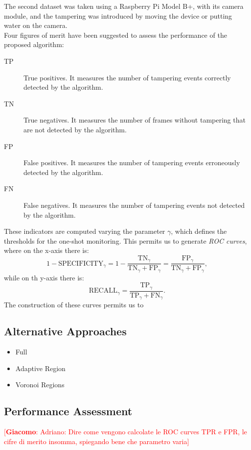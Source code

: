 \documentclass{llncs}
\newcommand{\gi}[1]{{\textcolor{red}{[\small \textbf{Giacomo}: #1]}}}
\begin{document}
The second dataset was taken using a Raspberry Pi Model B+, with its camera module, and the tampering was introduced by moving the device or putting water on the camera.\\
Four figures of merit have been suggested to assess the performance of the proposed algorithm:\\
\begin{description}
	\item[TP]  True positives. It measures the number of tampering events correctly detected by the algorithm.\\ 
	\item[TN]  True negatives. It measures the number of frames without tampering that are not detected by the algorithm. \\ 
	\item[FP]  False positives. It measures the number of tampering events erroneously detected by the algorithm.\\ 
	\item[FN]  False negatives. It measures the number of tampering events not detected by the algorithm. \\ 
\end{description} 
These indicators are computed varying the parameter $\gamma$, which defines the thresholds for the one-shot monitoring. 
This permits us to generate \textit{ROC curves}, where on the x-axis there is:
\[1-\text{SPECIFICITY}_\gamma = 1-\frac{\text{TN}_\gamma}{\text{TN}_\gamma+\text{FP}_\gamma}=\frac{\text{FP}_\gamma}{\text{TN}_\gamma+\text{FP}_\gamma},\]
while on th y-axis there is:
\[\text{RECALL}_\gamma=\frac{\text{TP}_\gamma}{\text{TP}_\gamma+\text{FN}_\gamma}.\]
The construction of these curves permits us to 

\subsection{Alternative Approaches}\label{subsec:AlternativeApproaches}
\begin{itemize}
\item Full
\item Adaptive Region
\item Voronoi Regions
\end{itemize}

\subsection{Performance Assessment}
\gi{Adriano: Dire come vengono calcolate le ROC curves TPR e FPR, le cifre di merito insomma, spiegando bene che parametro varia}
\end{document}
